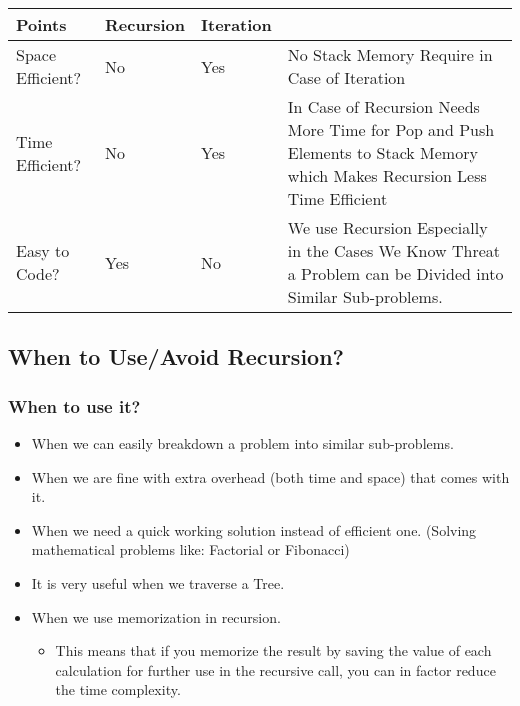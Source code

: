 \documentclass[10pt,letterpaper]{article}
\begin{document}
\begin{center}
\begin{tabular}{| p{3cm} | p{1.5cm} | p{1.5cm} | p{9cm} |}
\hline
\textbf{Points} & \textbf{Recursion} & \textbf{Iteration}& \\
\hline
Space Efficient? & No & Yes & No Stack Memory Require in Case of Iteration\\
\hline
Time Efficient? & No & Yes & In Case of Recursion Needs More Time for Pop and Push Elements to Stack Memory which Makes Recursion Less Time Efficient\\
\hline
Easy to Code? & Yes & No & We use Recursion Especially in the Cases We Know 
Threat a Problem can be Divided into Similar Sub-problems.\\
\hline
\end{tabular}
\end{center}

\subsection{When to Use/Avoid Recursion?}
\subsubsection{When to use it?}
\begin{itemize}
\item When we can easily breakdown a problem into similar sub-problems.
\item When we are fine with extra overhead (both time and space) that comes with it.
\item When we need a quick working solution instead of efficient one. (Solving mathematical problems like: Factorial or Fibonacci)
\item It is very useful when we traverse a Tree.
\item When we use memorization in recursion.
\begin{itemize}
\item This means that if you memorize the result by saving the value of each calculation for further use in the recursive call, you can in factor reduce the time complexity.
\end{itemize}
\end{itemize}
\end{document}
